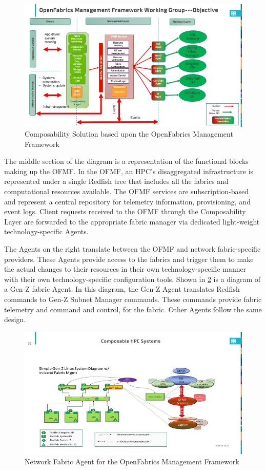\begin{figure}[ComposableSolution]
  \centerline{\includegraphics[width=\columnwidth]{ComposabilityHL_Diagram.jpeg}}
  \caption{Composability Solution based upon the OpenFabrics Management Framework}
  \label{fig:ofmf}
\end{figure}

The middle section of the diagram is a representation of the functional blocks making up the OFMF.  In the OFMF, an HPC's disaggregated infrastructure is represented under a single Redfish tree that includes all the fabrics and computational resources available. The OFMF services are subscription-based and represent a central repository for telemetry information, provisioning, and event logs.  Client requests received to the OFMF through the Composability Layer are forwarded to the appropriate fabric manager via dedicated light-weight technology-specific Agents. 

The Agents on the right translate between the OFMF and network fabric-specific providers.  These Agents provide access to the fabrics and trigger them to make the actual changes to their resources in their own technology-specific manner with their own technology-specific configuration tools.  Shown in \ref{fig:agent} is a diagram of a Gen-Z fabric Agent.  In this diagram, the Gen-Z Agent translates Redfish commands to Gen-Z Subnet Manager commands.  These commands provide fabric telemetry and command and control, for the fabric.  Other Agents follow the same design.

\begin{figure}[Hardware Agent]
  \centerline{\includegraphics[width=\columnwidth]{Slide32.jpeg}}
  \caption{Network Fabric Agent for the OpenFabrics Management Framework}
  \label{fig:agent}
\end{figure}



